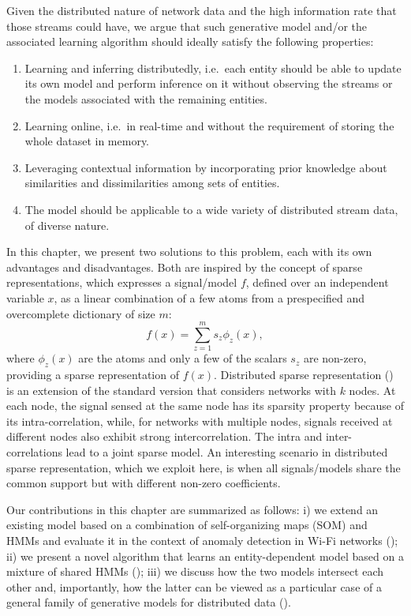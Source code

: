 Given the distributed nature of network data and the high information rate that those streams could have, we argue that such generative model and/or the associated learning algorithm should ideally satisfy the following properties:
\begin{enumerate}
    \item Learning and inferring distributedly, i.e.\ each entity should be able to update its own model and perform inference on it without observing the streams or the models associated with the remaining entities.
    \item Learning online, i.e.\ in real-time and without the requirement of storing the whole dataset in memory.
    \item Leveraging contextual information by incorporating prior knowledge about similarities and dissimilarities among sets of entities.
    \item The model should be applicable to a wide variety of distributed stream data, of diverse nature.
\end{enumerate}
In this chapter, we present two solutions to this problem, each with its own advantages and disadvantages. Both are inspired by the concept of sparse representations, which expresses a signal/model $f$, defined over an independent variable $x$, as a linear combination of a few atoms from a prespecified and overcomplete dictionary of size $m$:
\begin{equation}
    \label{eq:sparse_coding}
    f(x)=\sum_{z=1}^m s_z \phi_z(x),
\end{equation}
where $\phi_z(x)$ are the atoms and only a few of the scalars $s_z$ are non-zero, providing a sparse representation of $f(x)$.  Distributed sparse representation (\citet{Baron}) is an extension of the standard version that considers networks with $k$ nodes. At each node, the signal sensed at the same node has its sparsity property because of its intra-correlation, while, for networks with multiple nodes, signals received at different nodes also exhibit strong intercorrelation.
The intra and inter-correlations lead to a joint sparse model. An interesting scenario in distributed sparse representation, which we exploit here, is when all signals/models share the common support but with different non-zero coefficients.

Our contributions in this chapter are summarized as follows: i) we extend an existing model based on a combination of self-organizing maps (SOM) and HMMs and evaluate it in the context of anomaly detection in Wi-Fi networks (); ii) we present a novel algorithm that learns an entity-dependent model based on a mixture of shared HMMs (); iii) we discuss how the two models intersect each other and, importantly, how the latter can be viewed as a particular case of a general family of generative models for distributed data ().

